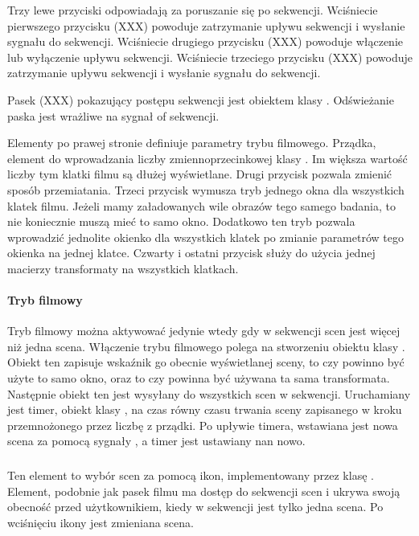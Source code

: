 \par
Trzy lewe przyciski odpowiadają za poruszanie się po sekwencji.
Wciśniecie pierwszego przycisku (XXX) powoduje zatrzymanie upływu sekwencji i wysłanie sygnału  do sekwencji.
Wciśniecie drugiego przycisku (XXX) powoduje włączenie lub wyłączenie upływu sekwencji.
Wciśniecie trzeciego przycisku (XXX) powoduje zatrzymanie upływu sekwencji i wysłanie sygnału  do sekwencji.
\par
Pasek (XXX) pokazujący postępu sekwencji jest obiektem klasy .
Odświeżanie paska jest wrażliwe na sygnał  of sekwencji.
\par
Elementy po prawej stronie definiuje parametry trybu filmowego.
Prządka, element do wprowadzania liczby zmiennoprzecinkowej klasy .
Im większa wartość liczby tym klatki filmu są dłużej wyświetlane.
Drugi przycisk pozwala zmienić sposób przemiatania.
Trzeci przycisk wymusza tryb jednego okna dla wszystkich klatek filmu.
Jeżeli mamy załadowanych wile obrazów tego samego badania, to nie koniecznie muszą mieć to samo okno.
Dodatkowo ten tryb pozwala wprowadzić jednolite okienko dla wszystkich klatek po zmianie parametrów tego okienka na jednej klatce.
Czwarty i ostatni przycisk służy do użycia jednej macierzy transformaty na wszystkich klatkach.

\paragraph*{Tryb filmowy}

\par
Tryb filmowy można aktywować jedynie wtedy gdy w sekwencji scen jest więcej niż jedna scena.
Włączenie trybu filmowego polega na stworzeniu obiektu klasy .
Obiekt ten zapisuje wskaźnik go obecnie wyświetlanej sceny, to czy powinno być użyte to samo okno, oraz to czy powinna być używana ta sama transformata.
Następnie obiekt ten jest wysyłany do wszystkich scen w sekwencji.
Uruchamiany jest timer, obiekt klasy , na czas równy czasu trwania sceny zapisanego w kroku przemnożonego przez liczbę z prządki.
Po upływie timera, wstawiana jest nowa scena za pomocą sygnały , a timer jest ustawiany nan nowo.

\subsubsection{}
\label{sec:sokar-framechooser}

Ten element to wybór scen za pomocą ikon, implementowany przez klasę .
Element, podobnie jak pasek filmu ma dostęp do sekwencji scen i ukrywa swoją obecność przed użytkownikiem, kiedy w sekwencji jest tylko jedna scena.
Po wciśnięciu ikony jest zmieniana scena.